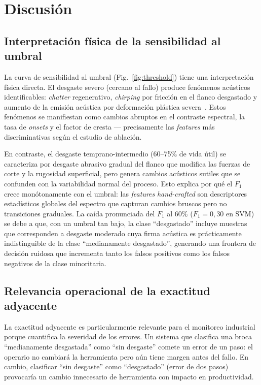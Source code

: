 \documentclass[10pt,twocolumn]{article}
\begin{document}
\section{Discusión}
\label{sec:discusion}

\subsection{Interpretación física de la sensibilidad al umbral}

La curva de sensibilidad al umbral (Fig.~\ref{fig:threshold}) tiene una
interpretación física directa. El desgaste severo (cercano al fallo)
produce fenómenos acústicos identificables: \textit{chatter} regenerativo,
\textit{chirping} por fricción en el flanco desgastado y aumento de la
emisión acústica por deformación plástica severa~\cite{bhuiyan2016}. Estos
fenómenos se manifiestan como cambios abruptos en el contraste espectral,
la tasa de \textit{onsets} y el factor de cresta --- precisamente las
\textit{features} más discriminativas según el estudio de ablación.

En contraste, el desgaste temprano-intermedio (60--75\% de vida útil) se
caracteriza por desgaste abrasivo gradual del flanco que modifica las
fuerzas de corte y la rugosidad superficial, pero genera cambios acústicos
sutiles que se confunden con la variabilidad normal del proceso. Esto
explica por qué el $F_1$ crece monótonamente con el umbral: las
\textit{features} \textit{hand-crafted} son descriptores estadísticos
globales del espectro que capturan cambios bruscos pero no transiciones
graduales. La caída pronunciada del $F_1$ al 60\% ($F_1 = 0{,}30$ en SVM)
se debe a que, con un umbral tan bajo, la clase ``desgastado'' incluye
muestras que corresponden a desgaste moderado cuya firma acústica es
prácticamente indistinguible de la clase ``medianamente desgastado'',
generando una frontera de decisión ruidosa que incrementa tanto los falsos
positivos como los falsos negativos de la clase minoritaria.

\subsection{Relevancia operacional de la exactitud adyacente}

La exactitud adyacente es particularmente relevante para el monitoreo
industrial porque cuantifica la severidad de los errores. Un sistema que
clasifica una broca ``medianamente desgastada'' como ``sin desgaste''
comete un error de un paso: el operario no cambiará la herramienta pero
aún tiene margen antes del fallo. En cambio, clasificar ``sin desgaste''
como ``desgastado'' (error de dos pasos) provocaría un cambio innecesario
de herramienta con impacto en productividad.
\end{document}
